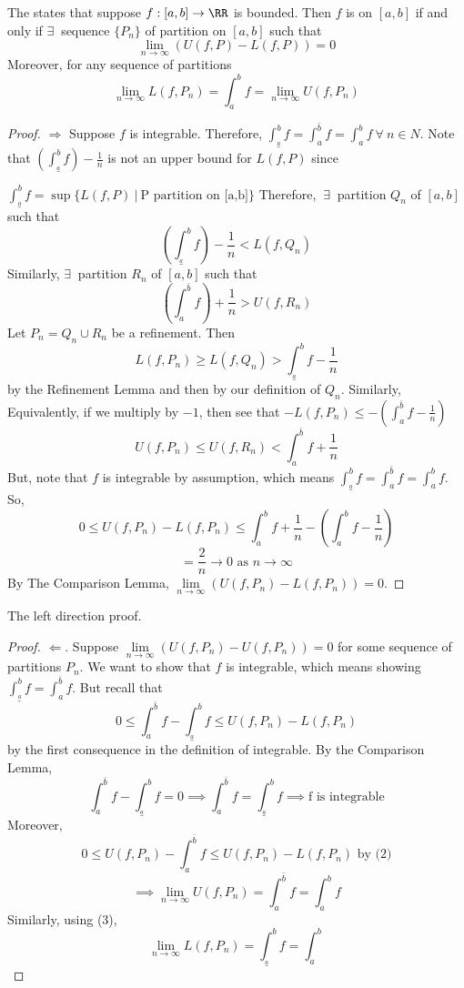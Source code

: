 \documentclass[12pt]{scrartcl}
\newcommand{\lint}{\int_{\overset{a}{\_}}^{b}}
\newcommand{\uint}{\int_a^{\bar{b}}}
\begin{document}
\begin{theorem}
  The  states that 
  suppose $f: [a,b] \to \RR$ is bounded. Then $f$ is  on 
  $[a,b]$ if and only if $\exists \ $ sequence $\{P_n\}$ of 
  partition on $[a,b]$ such that 
  \[\lim_{n\to\infty} (U(f, P) - L(f, P)) = 0\]
  Moreover, for any sequence of partitions
  \[\lim_{n\to\infty} L(f, P_n) = \int_a^b f = \lim_{n\to\infty}U(f, P_n)\]

  \begin{proof}

    \hfill

    $\Longrightarrow$ Suppose $f$ is integrable. Therefore, 
    $\lint f = \uint f = \int_a^b f \ \forall \ n \in N$.
    Note that $(\lint f) - \frac{1}{n}$ is not an upper bound for 
    $L(f, P)$ since 
    
    $\lint f = \sup\{L(f, P) \ | \ \text{P partition on [a,b]}\}$
    Therefore, $\ \exists \ $ partition $Q_n$ of $[a,b]$ such that 
    \[(\lint f) - \frac{1}{n} < L(f, Q_n)\]
    Similarly, $\exists \ $ partition $R_n$ of $[a,b]$ such that 
    \[(\uint f) + \frac{1}{n} > U(f, R_n)\]
    Let $P_n = Q_n \cup R_n$ be a refinement. Then 
    \[L(f, P_n) \geq L(f, Q_n) > \lint f - \frac{1}{n}\]
    by the Refinement Lemma and then by our definition of $Q_n$. Similarly, 
    Equivalently, if we multiply by $-1$, then see that $-L(f, P_n) \leq -(\uint f - \frac{1}{n})$
    \[U(f, P_n) \leq U(f, R_n) < \uint f + \frac{1}{n}\] 
    But, note that $f$ is integrable by assumption, which means 
    $\lint f = \uint f = \int_a^b f$. So,
    \[0 \leq U(f, P_n) - L(f, P_n) \leq \int_a^b f + \frac{1}{n} - (\int_a^b f - \frac{1}{n})\]
    \[= \frac{2}{n} \to 0 \text{ as } n \to \infty\]
    By The Comparison Lemma, $\underset{n\to\infty}{\lim}(U(f, P_n) - L(f, P_n)) = 0$. 
  \end{proof}
\end{theorem}

\begin{theorem}
  The  left direction proof.

  \begin{proof}
    
  \hfill

  $\Longleftarrow$. Suppose $\underset{n\to\infty}{\lim} (U(f, P_n) - U(f, P_n)) = 0$
  for some sequence of partitions $P_n$. We want to show that $f$ is integrable, 
  which means showing $\lint f = \uint f$. But recall that 
  \[0 \leq \uint f - \lint f \leq U(f, P_n) - L(f, P_n)\]
  by the first consequence in the definition of integrable. By the Comparison Lemma, 
  \[\uint f - \lint f = 0 \implies \uint f = \lint f \implies \text{f is integrable}\]
  Moreover, 
  \[0 \leq U(f, P_n) - \uint f \leq U(f, P_n) - L(f, P_n) \text{ by (2)}\]
  \[\implies \lim_{n\to\infty} U(f, P_n) = \uint f = \int_a^b f\]
  Similarly, using (3), 
  \[\lim_{n\to\infty} L(f, P_n) = \lint f = \int_a^b\]
  \end{proof}
\end{theorem}
\end{document}
